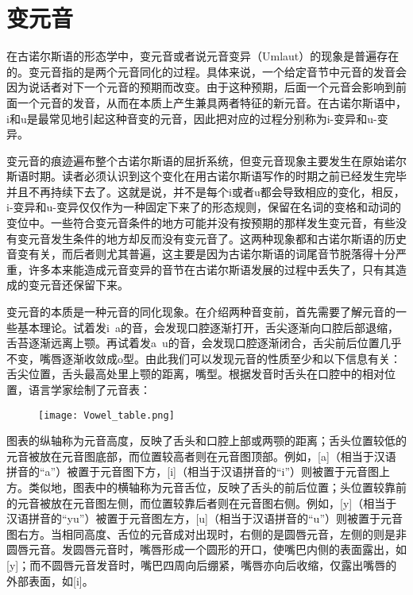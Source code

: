\section{变元音}
\label{变元音}

在古诺尔斯语的形态学中，变元音或者说元音变异（Umlaut）的现象是普遍存在的。变元音指的是两个元音同化的过程。具体来说，一个给定音节中元音的发音会因为说话者对下一个元音的预期而改变。由于这种预期，后面一个元音会影响到前面一个元音的发音，从而在本质上产生兼具两者特征的新元音。在古诺尔斯语中，i和u是最常见地引起这种音变的元音，因此把对应的过程分别称为i-变异和u-变异。

变元音的痕迹遍布整个古诺尔斯语的屈折系统，但变元音现象主要发生在原始诺尔斯语时期。读者必须认识到这个变化在用古诺尔斯语写作的时期之前已经发生完毕并且不再持续下去了。这就是说，并不是每个i或者u都会导致相应的变化，相反，i-变异和u-变异仅仅作为一种固定下来了的形态规则，保留在\textbf{}名词的变格和动词的变位中。一些符合变元音条件的地方可能并没有按预期的那样发生变元音，有些没有变元音发生条件的地方却反而没有变元音了。这两种现象都和古诺尔斯语的历史音变有关，而后者则尤其普遍，这主要是因为古诺尔斯语的词尾音节脱落得十分严重，许多本来能造成元音变异的音节在古诺尔斯语发展的过程中丢失了，只有其造成的变元音还保留下来。

变元音的本质是一种元音的同化现象。在介绍两种音变前，首先需要了解元音的一些基本理论。试着发i~a的音，会发现口腔逐渐打开，舌尖逐渐向口腔后部退缩，舌苔逐渐远离上颚。再试着发a~u的音，会发现口腔逐渐闭合，舌尖前后位置几乎不变，嘴唇逐渐收敛成o型。由此我们可以发现元音的性质至少和以下信息有关：舌尖位置，舌头最高处里上颚的距离，嘴型。根据发音时舌头在口腔中的相对位置，语言学家绘制了元音表：

\begin{figure}[H]
  \centering
  \texttt{[image: Vowel\_table.png]}
\end{figure}

图表的纵轴称为元音高度，反映了舌头和口腔上部或两颚的距离；舌头位置较低的元音被放在元音图底部，而位置较高者则在元音图顶部。例如，{[}a{]}（相当于汉语拼音的``a''）被置于元音图下方，{[}i{]}（相当于汉语拼音的``i''）则被置于元音图上方。类似地，图表中的横轴称为元音舌位，反映了舌头的前后位置；头位置较靠前的元音被放在元音图左侧，而位置较靠后者则在元音图右侧。例如，{[}y{]}（相当于汉语拼音的``yu''）被置于元音图左方，{[}u{]}（相当于汉语拼音的``u''）则被置于元音图右方。当相同高度、舌位的元音成对出现时，右侧的是圆唇元音，左侧的则是非圆唇元音。发圆唇元音时，嘴唇形成一个圆形的开口，使嘴巴内侧的表面露出，如{[}y{]}；而不圆唇元音发音时，嘴巴四周向后绷紧，嘴唇亦向后收缩，仅露出嘴唇的外部表面，如{[}i{]}。

